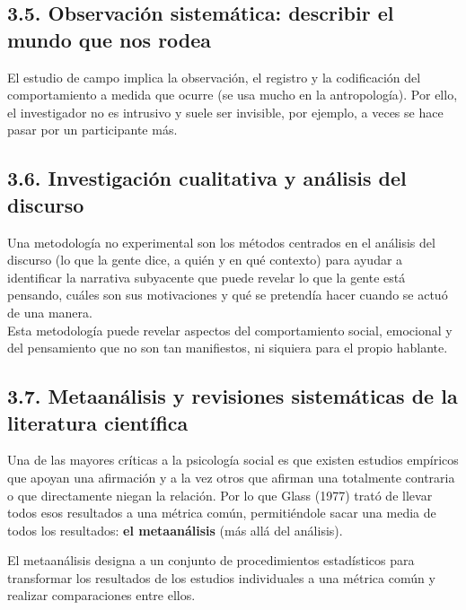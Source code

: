 \documentclass[
]{website}
\begin{document}
\subsection*{3.5. Observación sistemática: describir el mundo que nos rodea}\label{subtema3_5}

El estudio de campo implica la observación, el registro y la codificación del comportamiento a medida que ocurre (se usa mucho en la antropología). Por ello, el investigador no es intrusivo y suele ser invisible, por ejemplo, a veces se hace pasar por un participante más.

\subsection*{3.6. Investigación cualitativa y análisis del discurso}\label{subtema3_6}

Una metodología no experimental son los métodos centrados en el análisis del discurso (lo que la gente dice, a quién y en qué contexto) para ayudar a identificar la narrativa subyacente que puede revelar lo que la gente está pensando, cuáles son sus motivaciones y qué se pretendía hacer cuando se actuó de una manera.\\
Esta metodología puede revelar aspectos del comportamiento social, emocional y del pensamiento que no son tan manifiestos, ni siquiera para el propio hablante.

\subsection*{3.7. Metaanálisis y revisiones sistemáticas de la literatura científica}\label{subtema3_7}

Una de las mayores críticas a la psicología social es que existen estudios empíricos que apoyan una afirmación y a la vez otros que afirman una totalmente contraria o que directamente niegan la relación. Por lo que Glass (1977) trató de llevar todos esos resultados a una métrica común, permitiéndole sacar una media de todos los resultados: \textbf{el metaanálisis} (más allá del análisis).

El metaanálisis designa a un conjunto de procedimientos estadísticos para transformar los resultados de los estudios individuales a una métrica común y realizar comparaciones entre ellos.
\end{document}
